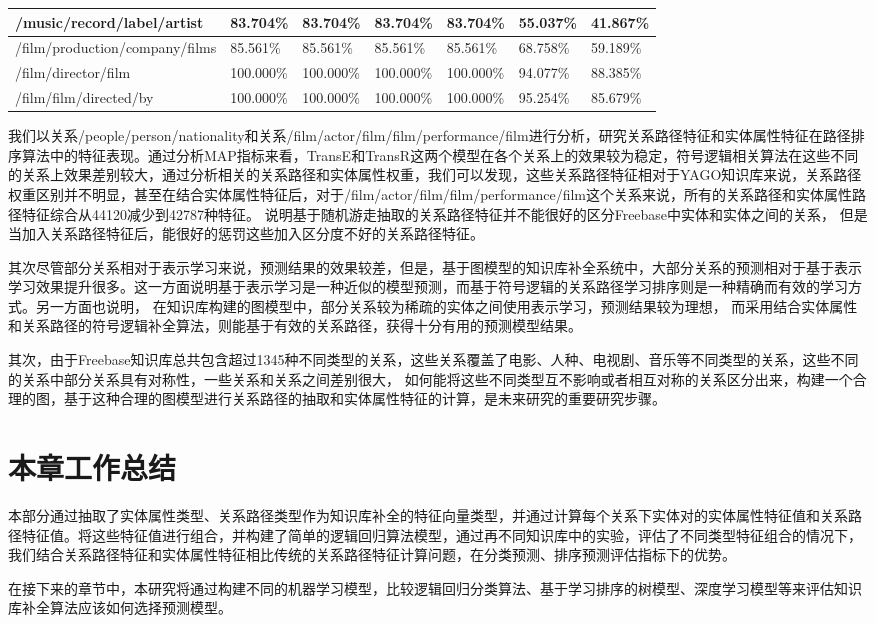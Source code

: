 \begin{table}[htbp]
\begin{tabular}{|p{5.8cm}|p{1.4cm}|p{1.4cm}|p{1.4cm}|p{1.4cm}|p{1.4cm}|p{1.4cm}|}
    \hline
    /music/record/label/artist & 83.704\% & 83.704\% & 83.704\% & 83.704\% & 55.037\% & 41.867\% \\
    \hline
    /film/production/company/films & 85.561\% & 85.561\% & 85.561\% & 85.561\% & 68.758\% & 59.189\% \\
    \hline
    /film/director/film & 100.000\% & 100.000\% & 100.000\% & 100.000\% & 94.077\% & 88.385\% \\
    \hline
    /film/film/directed/by & 100.000\% & 100.000\% & 100.000\% & 100.000\% & 95.254\% & 85.679\% \\
    \hline
    \end{tabular}%
  \label{tab:addlabel-fb-map}%
\end{table}%

我们以关系/people/person/nationality和关系/film/actor/film/film/performance/film进行分析，研究关系路径特征和实体属性特征在路径排序算法中的特征表现。通过分析MAP指标来看，TransE和TransR这两个模型在各个关系上的效果较为稳定，符号逻辑相关算法在这些不同的关系上效果差别较大，通过分析相关的关系路径和实体属性权重，我们可以发现，这些关系路径特征相对于YAGO知识库来说，关系路径权重区别并不明显，甚至在结合实体属性特征后，对于/film/actor/film/film/performance/film这个关系来说，所有的关系路径和实体属性路径特征综合从44120减少到42787种特征。
说明基于随机游走抽取的关系路径特征并不能很好的区分Freebase中实体和实体之间的关系，
但是当加入关系路径特征后，能很好的惩罚这些加入区分度不好的关系路径特征。

其次尽管部分关系相对于表示学习来说，预测结果的效果较差，但是，基于图模型的知识库补全系统中，大部分关系的预测相对于基于表示学习效果提升很多。这一方面说明基于表示学习是一种近似的模型预测，而基于符号逻辑的关系路径学习排序则是一种精确而有效的学习方式。另一方面也说明，
在知识库构建的图模型中，部分关系较为稀疏的实体之间使用表示学习，预测结果较为理想，
而采用结合实体属性和关系路径的符号逻辑补全算法，则能基于有效的关系路径，获得十分有用的预测模型结果。

其次，由于Freebase知识库总共包含超过1345种不同类型的关系，这些关系覆盖了电影、人种、电视剧、音乐等不同类型的关系，这些不同的关系中部分关系具有对称性，一些关系和关系之间差别很大，
如何能将这些不同类型互不影响或者相互对称的关系区分出来，构建一个合理的图，基于这种合理的图模型进行关系路径的抽取和实体属性特征的计算，是未来研究的重要研究步骤。

\section{本章工作总结}
本部分通过抽取了实体属性类型、关系路径类型作为知识库补全的特征向量类型，并通过计算每个关系下实体对的实体属性特征值和关系路径特征值。将这些特征值进行组合，并构建了简单的逻辑回归算法模型，通过再不同知识库中的实验，评估了不同类型特征组合的情况下，我们结合关系路径特征和实体属性特征相比传统的关系路径特征计算问题，在分类预测、排序预测评估指标下的优势。

在接下来的章节中，本研究将通过构建不同的机器学习模型，比较逻辑回归分类算法、基于学习排序的树模型、深度学习模型等来评估知识库补全算法应该如何选择预测模型。 
